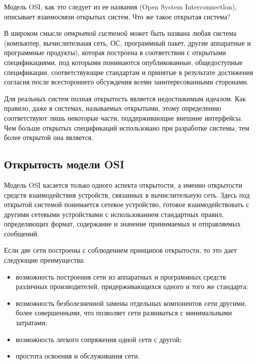 Модель OSI, как это следует из ее названия (Open System Interconnectlon), описывает взаимосвязи открытых систем.
Что же такое открытая система?

В широком смысле \emph{открытой системой} может быть названа любая система (компьютер, вычислительная сеть, ОС, программный пакет, другие аппаратные и программные продукты), которая построена в соответствии с открытыми спецификациями, под которыми понимаются опубликованные, общедоступные спецификации, соответствующие стандартам и принятые в результате достижения согласия после всестороннего обсуждения всеми заинтересованными сторонами.

Для реальных систем полная открытость является недостижимым идеалом.
Как правило, даже в системах, называемых открытыми, этому определению соответствуют лишь некоторые части, поддерживающие внешние интерфейсы.
Чем больше открытых спецификаций использовано при разработке системы, тем более открытой она является.

\subsection{Открытость модели OSI}

Модель OSI касается только одного аспекта открытости, а именно открытости средств взаимодействия устройств, связанных в вычислительную сеть.
Здесь под открытой системой понимается сетевое устройство, готовое взаимодействовать с другими сетевыми устройствами с использованием стандартных правил, определяющих формат, содержание и значение принимаемых и отправляемых сообщений.

Если две сети построены с соблюдением принципов открытости, то это дает следующие преимущества:
\begin{itemize}
    \item возможность построения сети из аппаратных и программных средств различных производителей, придерживающихся одного и того же стандарта;
    \item возможность безболезненной замены отдельных компонентов сети другими, более совершенными, что позволяет сети развиваться с минимальными затратами;
    \item возможность легкого сопряжения одной сети с другой;
    \item простота освоения и обслуживания сети.
\end{itemize}
